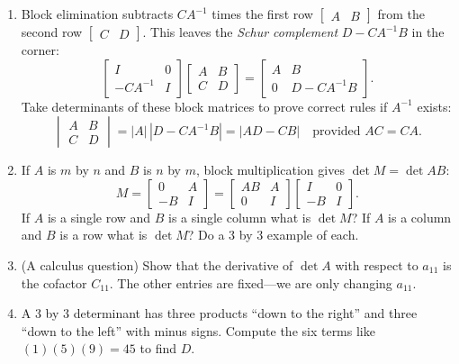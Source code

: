 \documentclass[14pt, a4paper]{article}
\begin{document}
\begin{enumerate}[resume]
    \item Block elimination subtracts $CA^{-1}$ times the first row $\begin{bmatrix} A & B \end{bmatrix}$ from the second row $\begin{bmatrix} C & D \end{bmatrix}$. This leaves the \textit{Schur complement} $D - CA^{-1}B$ in the corner:
          \[
              \begin{bmatrix} I & 0 \\ -CA^{-1} & I \end{bmatrix} \begin{bmatrix} A & B \\ C & D \end{bmatrix} =
              \begin{bmatrix} A & B \\ 0 & D - CA^{-1}B \end{bmatrix} .
          \]
          Take determinants of these block matrices to prove correct rules if $A^{-1}$ exists:
          \[
              \begin{vmatrix} A & B \\ C & D \end{vmatrix} = |A| \, |D - CA^{-1}B| = |AD - CB| \quad \text{provided } AC = CA.
          \]

    \item If $A$ is $m$ by $n$ and $B$ is $n$ by $m$, block multiplication gives $\det M = \det AB$:
          \[
              M = \begin{bmatrix} 0 & A \\ -B & I \end{bmatrix} =
              \begin{bmatrix} AB & A \\ 0 & I \end{bmatrix} \begin{bmatrix} I & 0 \\ -B & I \end{bmatrix} .
          \]
          If $A$ is a single row and $B$ is a single column what is $\det M$? If $A$ is a column and $B$ is a row what is $\det M$? Do a 3 by 3 example of each.

    \item (A calculus question) Show that the derivative of $\det A$ with respect to $a_{11}$ is the cofactor $C_{11}$. The other entries are fixed---we are only changing $a_{11}$.

    \item A 3 by 3 determinant has three products ``down to the right'' and three ``down to the left'' with minus signs. Compute the six terms like $(1)(5)(9) = 45$ to find $D$.



\end{enumerate}
\end{document}
